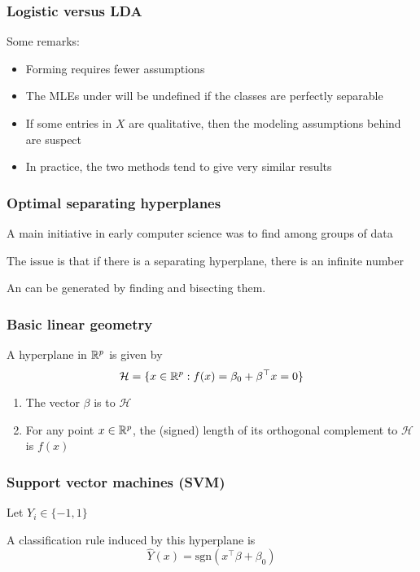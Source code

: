 \documentclass[12pt]{beamer}
\begin{document}
\begin{frame}
\frametitle{Logistic versus LDA}
Some remarks:
\begin{itemize}
\item Forming  requires fewer assumptions
\item The MLEs under  will be undefined if the classes are perfectly separable
\item If some entries in $X$ are qualitative, then the modeling assumptions behind  are suspect
\item In practice, the two methods tend to give very similar results
\end{itemize}
\end{frame}


\begin{frame}
\frametitle{Optimal separating hyperplanes}
A main initiative in early computer science was to find 
among groups of data


\vsp
The issue is that if there is a separating hyperplane, there is an infinite number

\vsp
An  can be generated by finding  and
bisecting them.

\end{frame}

\begin{frame}
\frametitle{Basic linear geometry}
A hyperplane in $\mathbb{R}^p$ is  given by 
\[
\mathcal{H} = \{x \in \mathbb{R}^p :  f(x) = \beta_0 + \beta^{\top}x = 0\}
\]

\vsp
\begin{enumerate}
\item The vector $\beta$ is  to $\mathcal{H}$

\item For any point $x \in \mathbb{R}^p$, the (signed) length of its orthogonal complement
to $\mathcal{H}$ is $f(x)$
\end{enumerate}
\end{frame}


\begin{frame}
\frametitle{Support vector machines (SVM)}
Let $Y_i \in \{-1,1\}$


\vsp
A classification rule induced by this hyperplane is
\[
\hat{Y}(x) = \textrm{sgn}(x^{\top}\beta + \beta_0)
\]
\end{frame}
\end{document}
